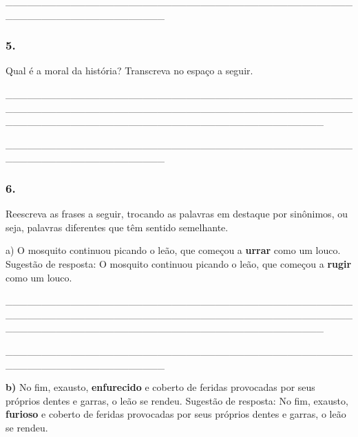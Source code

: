 \_\_\_\_\_\_\_\_\_\_\_\_\_\_\_\_\_\_\_\_\_\_\_\_\_\_\_\_\_\_\_\_\_\_\_\_\_\_\_\_\_\_\_\_\_\_\_\_\_\_\_\_\_\_\_\_\_\_\_\_\_\_\_\_\_\_\_\_\_\_

\subsubsection{5. }\label{section-4}

Qual é a moral da história? Transcreva no espaço a seguir.

\_\_\_\_\_\_\_\_\_\_\_\_\_\_\_\_\_\_\_\_\_\_\_\_\_\_\_\_\_\_\_\_\_\_\_\_\_\_\_\_\_\_\_\_\_\_\_\_\_\_\_\_\_\_\_\_\_\_\_\_\_\_\_\_\_\_\_\_\_\_\_\_\_\_\_\_\_\_\_\_\_\_\_\_\_\_\_\_\_\_\_\_\_\_\_\_\_\_\_\_\_\_\_\_\_\_\_\_\_\_\_\_\_\_\_\_\_\_\_\_\_\_\_\_\_\_\_\_\_\_\_\_\_\_\_\_\_\_\_\_

\_\_\_\_\_\_\_\_\_\_\_\_\_\_\_\_\_\_\_\_\_\_\_\_\_\_\_\_\_\_\_\_\_\_\_\_\_\_\_\_\_\_\_\_\_\_\_\_\_\_\_\_\_\_\_\_\_\_\_\_\_\_\_\_\_\_\_\_\_\_

\subsubsection{6. }\label{section-5}

Reescreva as frases a seguir, trocando as palavras em destaque por
sinônimos, ou seja, palavras diferentes que têm sentido
semelhante.


a) O mosquito continuou picando o leão, que começou a \textbf{urrar}
como um louco. \protect\hypertarget{_Hlk127196857}{}{}Sugestão de
resposta: O mosquito continuou picando o leão, que começou a
\textbf{rugir} como um louco.

\_\_\_\_\_\_\_\_\_\_\_\_\_\_\_\_\_\_\_\_\_\_\_\_\_\_\_\_\_\_\_\_\_\_\_\_\_\_\_\_\_\_\_\_\_\_\_\_\_\_\_\_\_\_\_\_\_\_\_\_\_\_\_\_\_\_\_\_\_\_\_\_\_\_\_\_\_\_\_\_\_\_\_\_\_\_\_\_\_\_\_\_\_\_\_\_\_\_\_\_\_\_\_\_\_\_\_\_\_\_\_\_\_\_\_\_\_\_\_\_\_\_\_\_\_\_\_\_\_\_\_\_\_\_\_\_\_\_\_\_

\_\_\_\_\_\_\_\_\_\_\_\_\_\_\_\_\_\_\_\_\_\_\_\_\_\_\_\_\_\_\_\_\_\_\_\_\_\_\_\_\_\_\_\_\_\_\_\_\_\_\_\_\_\_\_\_\_\_\_\_\_\_\_\_\_\_\_\_\_\_

\textbf{b)} \protect\hypertarget{_Hlk127196878}{}{}No fim, exausto,
\textbf{enfurecido} e coberto de feridas provocadas por seus próprios
dentes e garras, o leão se rendeu. Sugestão de resposta: No fim,
exausto, \textbf{furioso} e coberto de feridas provocadas por seus
próprios dentes e garras, o leão se rendeu.

